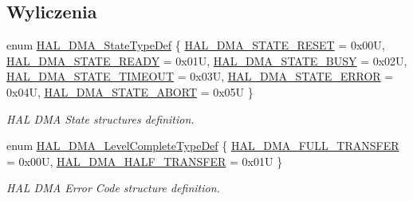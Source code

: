 \subsection*{Wyliczenia}
\begin{DoxyCompactItemize}
\item 
enum \hyperlink{group___d_m_a___exported___types_ga9c012af359987a240826f29073bbe463}{H\+A\+L\+\_\+\+D\+M\+A\+\_\+\+State\+Type\+Def} \{ \newline
\hyperlink{group___d_m_a___exported___types_gga9c012af359987a240826f29073bbe463a9e7be73da32b8c837cde0318e0d5eed2}{H\+A\+L\+\_\+\+D\+M\+A\+\_\+\+S\+T\+A\+T\+E\+\_\+\+R\+E\+S\+ET} = 0x00U, 
\hyperlink{group___d_m_a___exported___types_gga9c012af359987a240826f29073bbe463ad497944e6e72bc3ca904694b1098105a}{H\+A\+L\+\_\+\+D\+M\+A\+\_\+\+S\+T\+A\+T\+E\+\_\+\+R\+E\+A\+DY} = 0x01U, 
\hyperlink{group___d_m_a___exported___types_gga9c012af359987a240826f29073bbe463af7a0a2ca8de4e5be9e85b6a9073476ef}{H\+A\+L\+\_\+\+D\+M\+A\+\_\+\+S\+T\+A\+T\+E\+\_\+\+B\+U\+SY} = 0x02U, 
\hyperlink{group___d_m_a___exported___types_gga9c012af359987a240826f29073bbe463acf3a5443bf4dc71018512a255e2076eb}{H\+A\+L\+\_\+\+D\+M\+A\+\_\+\+S\+T\+A\+T\+E\+\_\+\+T\+I\+M\+E\+O\+UT} = 0x03U, 
\newline
\hyperlink{group___d_m_a___exported___types_gga9c012af359987a240826f29073bbe463ac2ce65c7cb2410c143b14e309ba83742}{H\+A\+L\+\_\+\+D\+M\+A\+\_\+\+S\+T\+A\+T\+E\+\_\+\+E\+R\+R\+OR} = 0x04U, 
\hyperlink{group___d_m_a___exported___types_gga9c012af359987a240826f29073bbe463af199cdb868cfd96fa97decb285643755}{H\+A\+L\+\_\+\+D\+M\+A\+\_\+\+S\+T\+A\+T\+E\+\_\+\+A\+B\+O\+RT} = 0x05U
 \}\begin{DoxyCompactList}\small\item\em H\+AL D\+MA State structures definition. \end{DoxyCompactList}
\item 
enum \hyperlink{group___d_m_a___exported___types_gaee3245eea8fa938edeb35a6c9596fd86}{H\+A\+L\+\_\+\+D\+M\+A\+\_\+\+Level\+Complete\+Type\+Def} \{ \hyperlink{group___d_m_a___exported___types_ggaee3245eea8fa938edeb35a6c9596fd86a5314147c8ba21548763bf89446b78468}{H\+A\+L\+\_\+\+D\+M\+A\+\_\+\+F\+U\+L\+L\+\_\+\+T\+R\+A\+N\+S\+F\+ER} = 0x00U, 
\hyperlink{group___d_m_a___exported___types_ggaee3245eea8fa938edeb35a6c9596fd86ad0ba8bc74a2ae6dcdc3e316e8be0d5d8}{H\+A\+L\+\_\+\+D\+M\+A\+\_\+\+H\+A\+L\+F\+\_\+\+T\+R\+A\+N\+S\+F\+ER} = 0x01U
 \}\begin{DoxyCompactList}\small\item\em H\+AL D\+MA Error Code structure definition. \end{DoxyCompactList}

\end{DoxyCompactItemize}

